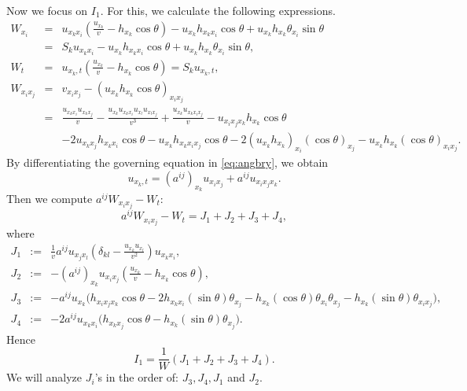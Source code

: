 \documentclass[12pt]{article}
\numberwithin{equation}{section}
\theoremstyle{plain}
\theoremstyle{definition}
\theoremstyle{remark}
\begin{document}
Now we focus on $I_1$. 
For this, we calculate the following expressions.
\begin{eqnarray*}
     W_{x_i} & = & u_{x_k x_i} \left( \frac{u_{x_k}}{v} - h_{x_k} \cos \theta \right)  - u_{x_k} h_{x_k x_i} \cos \theta + u_{x_k} h_{x_k} \theta_{x_i} \sin \theta  \\
    & = &  S_k u_{x_k x_i} - u_{x_k} h_{x_k x_i} \cos \theta + u_{x_k} h_{x_k} \theta_{x_i} \sin \theta , \\
    W_t & = &  u_{x_k,t} \left( \frac{u_{x_k}}{v} - h_{x_k} \cos \theta \right) = S_k u_{x_k,t}, \\
    W_{x_i x_j} & = &  v_{x_i x_j} - \left( u_{x_k} h_{x_k} \cos \theta \right)_{x_i x_j} \\
    & = &  \frac{u_{x_k x_i} u_{x_k x_j}}{v} - \frac{u_{x_k} u_{x_k x_i} u_{x_l} u_{x_l x_j}}{v^3} + \frac{u_{x_k} u_{x_k x_i x_j}}{v}  - u_{x_i x_j x_k} h_{x_k} \cos \theta \\
    & & - 2 u_{x_k x_j} h_{x_k x_i} \cos \theta - u_{x_k} h_{x_k x_i x_j} \cos \theta - 2 (u_{x_k} h_{x_k})_{x_i} (\cos \theta)_{x_j} - u_{x_k} h_{x_k} (\cos \theta)_{x_i x_j}.
\end{eqnarray*}
By differentiating the governing equation in \eqref{eq:angbry}, we obtain
\begin{equation*}
    u_{x_k,t} = (a^{ij})_{x_k} u_{x_i x_j} + a^{ij} u_{x_i x_j x_k}.
\end{equation*}
Then we compute $a^{ij} W_{x_i x_j} - W_t$:
\begin{equation}
\label{eq:ang_I1}
    a^{ij} W_{x_i x_j} - W_t
    = J_1 + J_2 + J_3 + J_4,
\end{equation}
where
\begin{eqnarray*}
    J_1 &  := &   \frac{1}{v} a^{ij} u_{x_j x_l} \left( \delta_{kl} - \frac{u_{x_k} u_{x_l}}{v^2} \right) u_{x_k x_i}, \\
    J_2 & := &  - (a^{ij})_{x_k} u_{x_i x_j} \left(\frac{u_{x_k}}{v} - h_{x_k} \cos \theta\right), \\
    J_3 & := & - a^{ij} u_{x_k} \big(h_{x_i x_j x_k} \cos \theta - 2 h_{x_k x_i} (\sin \theta )\theta_{x_j} - h_{x_k} (\cos \theta )\theta_{x_i} \theta_{x_j} - h_{x_k} (\sin\theta) \theta_{x_i x_j}\big), \\
    J_4 & := &  - 2 a^{ij} u_{x_k x_i} \big(h_{x_k x_j} \cos \theta - h_{x_k} (\sin \theta) \theta_{x_j}\big).
\end{eqnarray*}
Hence
\[
I_1 = \frac{1}{W}(J_1 + J_2 + J_3 + J_4). 
\]
We will analyze  $J_i$'s in the order of: $J_3, J_4, J_1$ and $J_2$. 
\end{document}
